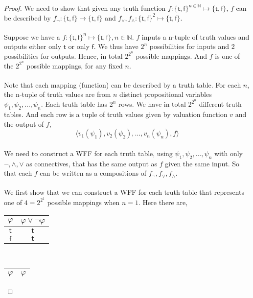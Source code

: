 \documentclass[12pt]{article}
\begin{document}
\begin{proof}
    We need to show that given any truth function $f \colon \{\mathsf{t}, \mathsf{f}\}^{n \in \mathbb{N}} \longmapsto \{\mathsf{t}, \mathsf{f}\}$, $f$ can be described by $f_{\neg} \colon \{\mathsf{t}, \mathsf{f}\} \longmapsto \{\mathsf{t}, \mathsf{f}\} $ and $f_{\lor}, f_{\land} \colon \{\mathsf{t}, \mathsf{f}\}^2 \longmapsto \{\mathsf{t}, \mathsf{f}\}$.\\
    \\
    Suppose we have a $f \colon \{\mathsf{t}, \mathsf{f}\}^n \longmapsto \{\mathsf{t}, \mathsf{f}\}, n \in \mathbb{N}$.
    $f$ inputs a n-tuple of truth values and outputs either only $\mathsf{t}$ or only $\mathsf{f}$.
    We thus have $2^n$ possibilities for inputs and 2 possibilities for outputs. 
    Hence, in total $2^{2^n}$ possible mappings.
    And $f$ is one of the $2^{2^n}$ possible mappings, for any fixed $n$.\\
    \\
    Note that each mapping (function) can be described by a truth table.
    For each $n$, the n-tuple of truth values are from $n$ distinct propositional variables $\psi_1, \psi_2, \dots, \psi_n$.
    Each truth table has $2^n$ rows.
    We have in total $2^{2^n}$ different truth tables.
    And each row is a tuple of truth values given by valuation function $v$ and the output of $f$,
    $$\langle v_1(\psi_1), v_2(\psi_2), \dots, v_n(\psi_n), f \rangle$$
    \\
    We need to construct a WFF for each truth table, using $\psi_1, \psi_2, \dots, \psi_n$ with only $\neg, \land, \lor$ as connectives, that has the same output as $f$ given the same input.
    So that each $f$ can be written as a compositions of $f_{\neg}, f_{\lor}, f_{\land}$.\\
    \\
    We first show that we can construct a WFF for each truth table that represents one of $4 = 2^{2^1}$ possible mappings when $n = 1$.
    Here there are,
    \begin{center}
        \begin{tabular}{c|c}
            $\varphi$ & $\varphi \lor \neg \varphi$\\ \hline
            $\mathsf{t}$ & $\mathsf{t}$\\
            $\mathsf{f}$ & $\mathsf{t}$\\
        \end{tabular}
        ~~~
        \begin{tabular}{c|c}
            $\varphi$ & $\varphi$ \\ \hline

\end{tabular}
\end{center}
\end{proof}
\end{document}
